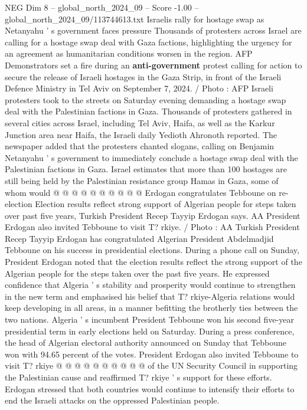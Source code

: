 \begin{textsample}{NEG Dim 8 – global\_north\_2024\_09 – Score -1.00 – global\_north\_2024\_09/113744613.txt}  \label{ex:f8_neg_154}
Israelis rally for hostage swap as Netanyahu ' s government faces pressure Thousands of protesters across Israel are calling for a hostage swap deal with Gaza factions, highlighting the urgency for an agreement as humanitarian conditions worsen in the region.
AFP Demonstrators set a fire during an \textbf{anti-government} protest calling for action to secure the release of Israeli hostages in the Gaza Strip, in front of the Israeli Defence Ministry in Tel Aviv on September 7, 2024. / Photo : AFP Israeli protesters took to the streets on Saturday evening demanding a hostage swap deal with the Palestinian factions in Gaza.
Thousands of protesters gathered in several cities across Israel, including Tel Aviv, Haifa, as well as the Karkur Junction area near Haifa, the Israeli daily Yedioth Ahronoth reported.
The newspaper added that the protesters chanted slogans, calling on Benjamin Netanyahu ' s government to immediately conclude a hostage swap deal with the Palestinian factions in Gaza.
Israel estimates that more than 100 hostages are still being held by the Palestinian resistance group Hamas in Gaza, some of whom would @ @ @ @ @ @ @ @ @ @ Erdogan congratulates Tebboune on re-election Election results reflect strong support of Algerian people for steps taken over past five years, Turkish President Recep Tayyip Erdogan says.
AA President Erdogan also invited Tebboune to visit T? rkiye. / Photo : AA Turkish President Recep Tayyip Erdogan has congratulated Algerian President Abdelmadjid Tebboune on his success in presidential elections.
During a phone call on Sunday, President Erdogan noted that the election results reflect the strong support of the Algerian people for the steps taken over the past five years.
He expressed confidence that Algeria ' s stability and prosperity would continue to strengthen in the new term and emphasised his belief that T? rkiye-Algeria relations would keep developing in all areas, in a manner befitting the brotherly ties between the two nations.
Algeria ' s incumbent President Tebboune won his second five-year presidential term in early elections held on Saturday.
During a press conference, the head of Algerian electoral authority announced on Sunday that Tebboune won with 94.65 percent of the votes.
President Erdogan also invited Tebboune to visit T? rkiye @ @ @ @ @ @ @ @ @ @ of the UN Security Council in supporting the Palestinian cause and reaffirmed T? rkiye ' s support for these efforts.
Erdogan stressed that both countries would continue to intensify their efforts to end the Israeli attacks on the oppressed Palestinian people.

\end{textsample}
